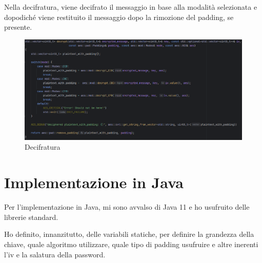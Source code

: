  

\textsf{\small Nella decifratura, viene decifrato il messaggio in base alla modalità selezionata e dopodiché viene restituito il messaggio dopo la rimozione del padding, se presente.}

\begin{figure}[H]
	\centering
	\includegraphics[width=1\textwidth, height=1\textheight, keepaspectratio]{./images/code/cpp/api/decrypt.PNG}
	\caption{Decifratura}
	\label{fig:decrypt}
\end{figure}




\section{Implementazione in Java}


\textsf{\small Per l'implementazione in Java, mi sono avvalso di Java 11 e ho usufruito delle librerie standard.}

   

\textsf{\small Ho definito, innanzitutto, delle variabili statiche, per definire la grandezza della chiave, quale algoritmo utilizzare, quale tipo di padding usufruire e altre inerenti l'iv e la salatura della password.}

